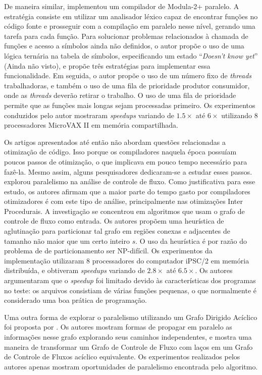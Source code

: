De maneira similar, \cite{wortman1992} implementou um compilador de Modula-2+
paralelo. A estratégia consiste em utilizar um analisador léxico capaz de
encontrar funções no código fonte e prosseguir com a compilação em paralelo
nesse nível, gerando uma tarefa para cada função. Para solucionar problemas
relacionados à chamada de funções e
acesso a símbolos ainda não definidos, o autor propõe o uso de
uma lógica ternária na tabela de símbolos, especificando um estado
``\textit{Doesn't know yet}'' (Ainda não visto), e propõe três estratégias para
implementar essa funcionalidade. Em seguida, o autor propõe o uso de
um número fixo de \textit{threads} trabalhadoras, e também o uso de uma fila de
prioridade produtor consumidor, onde as \textit{threads} deverão retirar o trabalho.
O uso de uma fila de prioridade permite que as funções mais longas sejam
processadas primeiro. Os experimentos conduzidos pelo autor mostraram
\textit{speedups} variando de $1.5\times$ até $6\times$ utilizando 8
processadores MicroVAX II em memória compartilhada.

Os artigos apresentados até então não abordam questões relacionadas
a otimização de código. Isso porque os compiladores naquela época possuíam poucos
passos de otimização, o que implicava em pouco tempo necessário para fazê-la.
Mesmo assim, alguns pesquisadores dedicaram-se a estudar esses passos.
\cite{Lee1994} explorou paralelismo na análise de controle
de fluxo. Como justificativa para esse estudo, os autores afirmam que a maior parte
do tempo gasto por compiladores otimizadores é com este tipo de análise,
principalmente nas otimizações Inter Procedurais. 
A investigação se concentrou em algoritmos que usam o grafo de controle
de fluxo como entrada. Os autores propõem uma heurística de aglutinação
para particionar tal grafo em regiões conexas e adjacentes de tamanho não maior
que um certo inteiro $s$. O uso da heurística é por razão do problema de
de particionamento ser NP-difícil.
Os experimentos da implementação utilizaram
8 processadores do computador iPSC/2 em memória distribuída, e 
obtiveram \textit{speedups} variando de
$2.8 \times$ até $6.5\times$. Os autores argumentaram que o \textit{speedup} foi
limitado devido às características dos programas no teste: os arquivos consistiam
de várias funções pequenas, o que normalmente é considerado uma boa prática de
programação.

Uma outra forma de explorar o paralelismo utilizando um Grafo Dirigido Acíclico
foi proposta por \cite{kramer1994combining}. Os autores mostram formas de propagar
em paralelo as informações nesse grafo explorando seus caminhos independentes,
e mostra uma maneira de transformar um Grafo de Controle de Fluxo com laços em
um Grafo de Controle de Fluxos acíclico equivalente. Os experimentos realizados
pelos autores apenas mostram oportunidades de paralelismo encontrada pelo
algoritmo.

